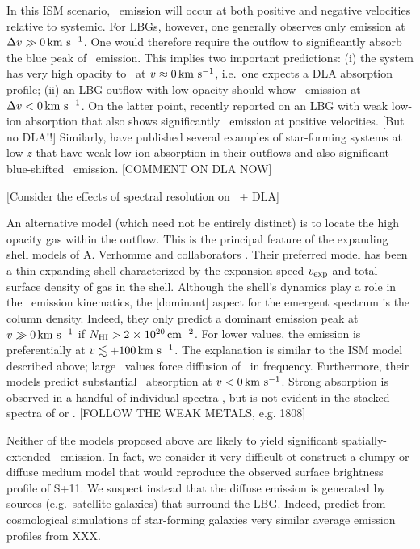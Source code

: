 \documentclass[12pt,preprint]{aastex}
\begin{document}
In this ISM scenario, \lya\ emission will occur at both positive and
negative velocities relative to systemic.  For LBGs, however, one
generally observes only emission at $\Delta v \gg 0 \, {\rm km~s^{-1}}$.  
One would therefore require the outflow to significantly absorb the
blue peak of \lya\ emission.  This implies two important predictions: 
(i) the system has very high opacity to \lya\ at $v \approx 0 \, {\rm km~s^{-1}}$,
i.e.\ one expects a DLA absorption profile;
(ii) an LBG outflow with low opacity should whow \lya\ emission at
$\Delta v < 0 \, {\rm km~s^{-1}}$.  On the latter point, \cite{erb+10} recently
reported on an LBG with weak low-ion absorption that also shows
significantly \lya\ emission at positive velocities.  [But no DLA!!]
Similarly, \cite{heckman+11} have published several examples of
star-forming systems at low-$z$ that have weak low-ion absorption in
their outflows and also significant blue-shifted \lya\ emission.  
[COMMENT ON DLA NOW]

[Consider the effects of spectral resolution on \lya\ + DLA]

An alternative model (which need not be entirely distinct) is to
locate the high opacity  gas within the outflow.  This is
the principal feature of the expanding shell models of
A. Verhomme and collaborators \citep{verhommea,verhommeb}.  
Their preferred model has been a thin
expanding shell characterized by the expansion speed $v_{\rm exp}$ and
total surface density of  gas in the shell.  Although the
shell's dynamics play a role in the \lya\ emission kinematics, the
[dominant] aspect for the emergent spectrum is the  column
density.  Indeed, they only predict a dominant emission peak at $v \gg
0 \, {\rm km~s^{-1}}$ if $N_{\rm HI} > 2{\; \times \; 10^{20}} \, {\rm cm^{-2}}$.  For lower values, the
emission is preferentially at $v \lesssim +100 \, {\rm km~s^{-1}}$.  The
explanation is similar to the ISM model described above;  large \nhi\
values force diffusion of \lya\ in frequency.  Furthermore, their
models predict substantial \lya\ absorption at $v < 0 \, {\rm km~s^{-1}}$.  
Strong absorption is observed in a handful of individual spectra
\citep[e.g.][]{cb58,dessauges}, but is not evident in the stacked
spectra of \cite{shapley93} or \cite{steidel+10}.  
[FOLLOW THE WEAK METALS, e.g. 1808]


Neither of the models proposed above are likely to yield significant
spatially-extended \lya\ emission.  In fact, we consider it very
difficult ot construct a clumpy or diffuse medium model that would
reproduce the observed surface brightness profile of S+11.  We suspect
instead that the diffuse emission is generated by sources (e.g.\
satellite galaxies) that surround the LBG.  Indeed, \cite{kasen+11}
predict from cosmological simulations of star-forming galaxies very
similar average emission profiles from XXX.
\end{document}

